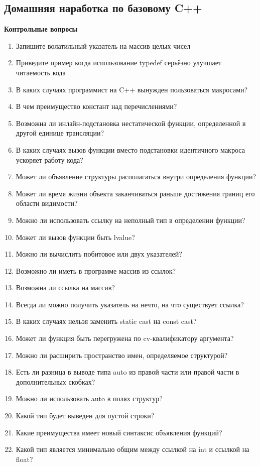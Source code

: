 \documentclass[a4paper,12pt,oneside]{article}
\begin{document}
\pagebreak
\subsection{Домашняя наработка по базовому C++}

\textbf{Контрольные вопросы} 

\begin{enumerate}
\item Запишите волатильный указатель на массив целых чисел
\item Приведите пример когда использование typedef серьёзно улучшает читаемость кода
\item В каких случаях программист на C++ вынужден пользоваться макросами?
\item В чем преимущество констант над перечислениями?
\item Возможна ли инлайн-подстановка нестатической функции, определенной в другой единице трансляции?
\item В каких случаях вызов функции вместо подстановки идентичного макроса ускоряет работу кода?
\item Может ли объявление структуры располагаться внутри определения функции?
\item Может ли время жизни объекта заканчиваться раньше достижения границ его области видимости?
\item Можно ли использовать ссылку на неполный тип в определении функции?
\item Может ли вызов функции быть lvalue?
\item Можно ли вычислить побитовое или двух указателей?
\item Возможно ли иметь в программе массив из ссылок?
\item Возможна ли ссылка на массив?
\item Всегда ли можно получить указатель на нечто, на что существует ссылка?
\item В каких случаях нельзя заменить static cast на const cast?
\item Может ли функция быть перегружена по cv-квалификатору аргумента?
\item Можно ли расширить пространство имен, определяемое структурой?
\item Есть ли разница в выводе типа auto из правой части или правой части в дополнительных скобках?
\item Можно ли использовать auto в полях структур?
\item Какой тип будет выведен для пустой строки?
\item Какие преимущества имеет новый синтаксис объявления функций?
\item Какой тип является минимально общим между ссылкой на int и ссылкой на float?
\end{enumerate}
\end{document}
